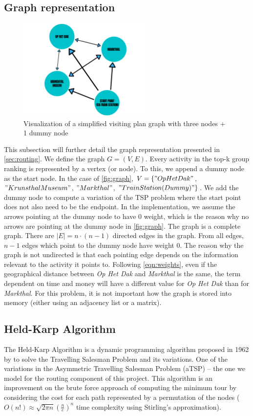 \documentclass[11pt,a4paper,oneside]{article}
\begin{document}
\subsection{Graph representation}
\begin{figure}[H]
    \centering
    \includegraphics[width=0.6\textwidth]{paper/imgs/graph.png}
    \caption{Visualization of a simplified visiting plan graph with three nodes + 1 dummy node}
    \label{fig:graph}
\end{figure}
This subsection will further detail the graph representation presented in \autoref{sec:routing}. We define the graph $G = (V, E)$. Every activity in the top-k group ranking is represented by a vertex (or node). To this, we append a dummy node as the start node. In the case of \autoref{fig:graph}, $V = \{"Op Het Dak"$, $"Krunsthal Museum"$, $"Markthal"$, $"Train Station (Dummy)"\}$. We add the dummy node to compute a variation of the TSP problem where the start point does not also need to be the endpoint. In the implementation, we assume the arrows pointing at the dummy node to have $0$ weight, which is the reason why no arrows are pointing at the dummy node in \autoref{fig:graph}. The graph is a complete graph. There are $|E| = n \cdot (n - 1)$ directed edges in the graph. From all edges, $n - 1$ edges which point to the dummy node have weight $0$. The reason why the graph is not undirected is that each pointing edge depends on the information relevant to the activity it points to. Following \autoref{eqn:weights}, even if the geographical distance between \emph{Op Het Dak} and \emph{Markthal} is the same, the term dependent on time and money will have a different value for \emph{Op Het Dak} than for \emph{Markthal}. For this problem, it is not important how the graph is stored into memory (either using an adjacency list or a matrix).

\subsection{Held-Karp Algorithm}
The Held-Karp Algorithm is a dynamic programming algorithm proposed in 1962 by \citeauthor{held_DynamicProgrammingApproach_1962} to solve the Travelling Salesman Problem and its variations. One of the variations in the Asymmetric Travelling Salesman Problem (aTSP) -- the one we model for the routing component of this project.\cite{held_DynamicProgrammingApproach_1962} This algorithm is an improvement on the brute force approach of computing the minimum tour by considering the cost for each path represented by a permutation of the nodes ($O(n!) \approx \sqrt{2 \pi n}(\frac{n}{e})^n$ time complexity using Stirling's approximation).
\end{document}
